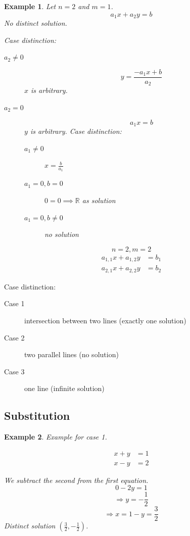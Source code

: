 \documentclass[a4paper,landscape,twocolumn]{article}
\newtheorem{ex}{Example}
\begin{document}
\begin{ex}
Let $n = 2$ and $m=1$.
\[ a_1 x + a_2 y = b \]
No distinct solution.

Case distinction:
\begin{description}
  \item[$a_2 \neq 0$]
    \[ y = \frac{-a_1 x + b}{a_2} \]
    $x$ is arbitrary.
  \item[$a_2 = 0$]
    \[ a_1 x = b \]
    $y$ is arbitrary. Case distinction:
    \begin{description}
      \item[$a_1 \neq 0$] $x = \frac{b}{a_1}$
      \item[$a_1 = 0, b = 0$] $0 = 0 \implies \mathbb{R}$ as solution
      \item[$a_1 = 0, b \neq 0$] no solution
    \end{description}
\end{description}
\end{ex}

\[ n = 2, m = 2 \]
\begin{align*}
  a_{1,1} x + a_{1,2} y &= b_1 \\
  a_{2,1} x + a_{2,2} y &= b_2
\end{align*}

Case distinction:
\begin{description}
  \item[Case 1]
    intersection between two lines (exactly one solution)
  \item[Case 2]
    two parallel lines (no solution)
  \item[Case 3]
    one line (infinite solution)
\end{description}

\subsection{Substitution}

\begin{ex}
  Example for case 1.

  \begin{align*}
    x + y &= 1 \\
    x - y &= 2
  \end{align*}

  We subtract the second from the first equation.
  \[ 0 - 2y = 1 \]
  \[ \Rightarrow y = -\frac12 \]
  \[ \Rightarrow x = 1 - y = \frac32 \]
  Distinct solution $(\frac32, -\frac12)$.
\end{ex}
\end{document}
